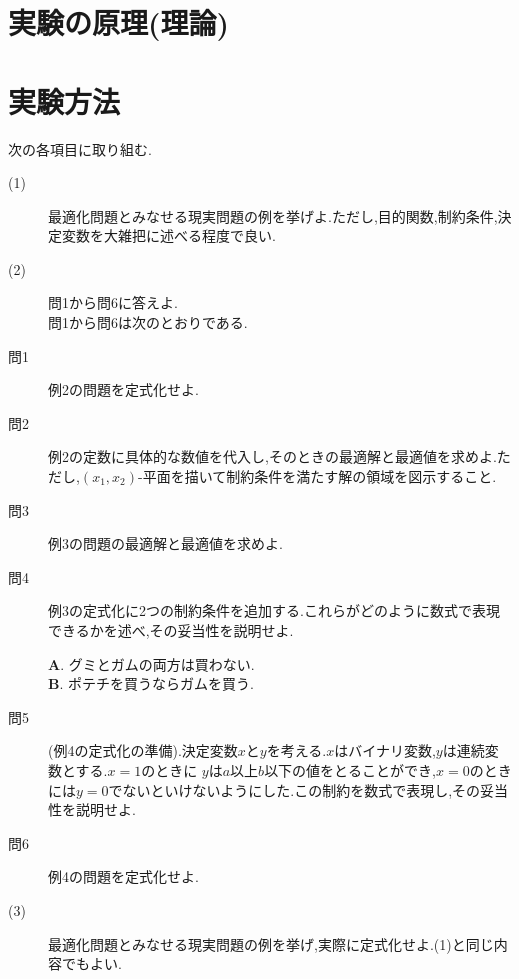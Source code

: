 \documentclass[12pt]{jarticle}
\begin{document}

\section{実験の原理(理論)}

\section{実験方法}
次の各項目に取り組む.
\begin{description}
	\item[(1)] 最適化問題とみなせる現実問題の例を挙げよ.ただし,目的関数,制約条件,決定変数を大雑把に述べる程度で良い.
	\item[(2)]問1から問6に答えよ.\\
	      問1から問6は次のとおりである.\\
	\item[問1] 例2の問題を定式化せよ.
	\item[問2] 例2の定数に具体的な数値を代入し,そのときの最適解と最適値を求めよ.ただし,$(x_1,x_2)$-平面を描いて制約条件を満たす解の領域を図示すること.
	\item[問3] 例3の問題の最適解と最適値を求めよ.
	\item[問4] 例3の定式化に2つの制約条件を追加する.これらがどのように数式で表現できるかを述べ,その妥当性を説明せよ.
	      \begin{center}
		      \textbf{A}. グミとガムの両方は買わない.\\
		      \textbf{B}. ポテチを買うならガムを買う.\\
	      \end{center}
	\item[問5] (例4の定式化の準備).決定変数$x$と$y$を考える.$x$はバイナリ変数,$y$は連続変数とする.$x=1$のときに
	      $y$は$a$以上$b$以下の値をとることができ,$x=0$のときには$y=0$でないといけないようにした.この制約を数式で表現し,その妥当性を説明せよ. 
	\item[問6] 例4の問題を定式化せよ.
	\item[(3)]最適化問題とみなせる現実問題の例を挙げ,実際に定式化せよ.(1)と同じ内容でもよい.
\end{description}
\end{document}
